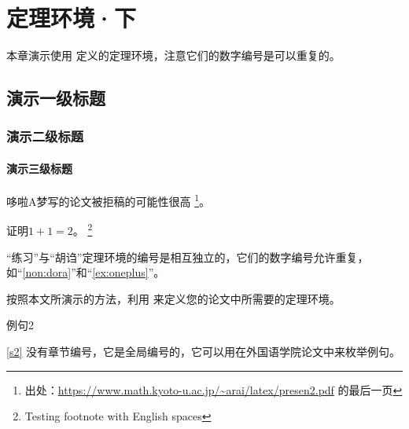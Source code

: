 \chapter{定理环境·下}

本章演示使用  定义的定理环境，注意它们的数字编号是可以重复的。

\section{演示一级标题}
\subsection{演示二级标题}
\subsubsection{演示三级标题}

\begin{nonsense}
\label{non:dora}
哆啦A梦写的论文被拒稿的可能性很高
\footnote{出处：\url{https://www.math.kyoto-u.ac.jp/~arai/latex/presen2.pdf} 的最后一页}。
\end{nonsense}

\begin{exercise}
\label{ex:oneplus}
证明$1+1 = 2$。
\footnote{Testing footnote with English spaces}
\end{exercise}

\begin{nonsense}[右边的胡诌是真的]
“练习”与“胡诌”定理环境的编号是相互独立的，它们的数字编号允许重复，
如“\autoref{non:dora}”和“\autoref{ex:oneplus}”。
\end{nonsense}

\begin{exercise}
按照本文所演示的方法，利用  来定义您的论文中所需要的定理环境。
\end{exercise}

\begin{lines}
\label{s2}
例句2
\end{lines}

\autoref{s2} 没有章节编号，它是全局编号的，它可以用在外国语学院论文中来枚举例句。

